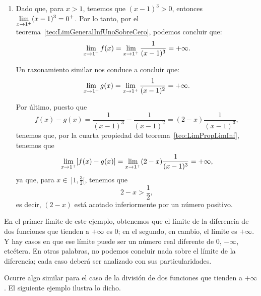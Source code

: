 \begin{exemplo}[Solución]
\begin{enumerate}[leftmargin=*]
\item Dado que, para $x > 1$, tenemos que $(x - 1)^3 > 0$, entonces $\displaystyle\limjc{(x -
    1)^3}{x}{1^+} = 0^+$. Por lo tanto, por el teorema~\ref{teo:LimGeneralInfUnoSobreCero},
    podemos concluir que:
    \[
      \limjc{f(x)}{x}{1^+} = \limjc{\frac{1}{(x - 1)^3}}{x}{1^+} = +\infty.
    \]

    Un razonamiento similar nos conduce a concluir que:
    \[
      \limjc{g(x)}{x}{1^+} = \limjc{\frac{1}{(x - 1)^2}}{x}{1^+} = +\infty.
    \]

    Por último, puesto que
    \[
      f(x) - g(x) = \frac{1}{(x - 1)^3} - \frac{1}{(x - 1)^2} = (2 - x)\frac{1}{(x - 1)^3},
    \]
    tenemos que, por la cuarta propiedad del teorema~\ref{teo:LimPropLimInf}, tenemos que
    \[
      \limjc{[f(x) - g(x)]}{x}{1^+} = \limjc{(2 - x)\frac{1}{(x - 1)^3}}{x}{1^+} = +\infty,
    \]
    ya que, para $x \in\ ]1, \frac{3}{2}[$, tenemos que
    \[
        2 - x > \frac{1}{2},
    \]
    es decir, $(2 - x)$ está acotado inferiormente por un número positivo.
\end{enumerate}
\end{exemplo}

En el primer límite de este ejemplo, obtenemos que el límite de la diferencia de dos funciones que
tienden a $+\infty$ es $0$; en el segundo, en cambio, el límite es $+\infty$. Y hay casos en que
ese límite puede ser un número real diferente de $0$, $-\infty$, etcétera. En otras palabras, no
podemos concluir nada sobre el límite de la diferencia; cada caso deberá ser analizado con sus
particularidades.

Ocurre algo similar para el caso de la división de dos funciones que tienden a $+\infty$. El
siguiente ejemplo ilustra lo dicho.

